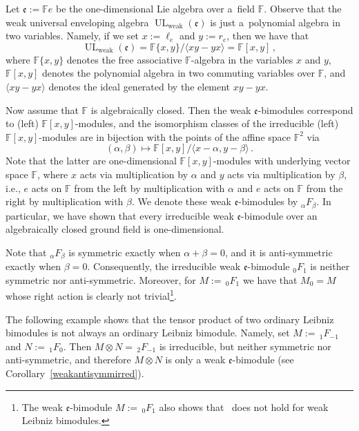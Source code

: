 \documentclass{jonasart}
\DeclareMathOperator{\UL}{UL}
\DeclareMathOperator{\weak}{weak}
\newcommand{\ef}{\mathfrak{e}}
\newcommand{\fbb}{\mathbb{F}}
\begin{document}
	\begin{example}\label{weak1dim}
		{Let $\ef:=\fbb e$ be the one-dimensional Lie algebra over a~field
		$\fbb$. Observe that the weak universal enveloping algebra $\UL_{\weak}
		(\ef)$ is just a~polynomial algebra in two variables. Namely, if we set $x:=
		\ell_e$ and $y:=r_e$, then we have that}
		\[
			\UL_{\weak}(\ef)=\fbb\{x,y\}/\langle xy-yx\rangle=\fbb[x,y]\,,
		\]
		{where $\fbb\{x,y\}$ denotes the free associative $\fbb$-algebra in the variables $x$ and $y$, $\fbb[x,y]$ denotes the polynomial algebra in two commuting variables over $\fbb$, and $\langle xy-yx\rangle$ denotes the ideal generated by the element $xy-yx$.}

		{Now assume that $\fbb$ is algebraically closed. Then the weak $\ef$-bimodules correspond to (left) $\fbb[x,y]$-modules, and the isomorphism classes of the irreducible (left) $\fbb[x,y]$-modules are in bijection with the points of the affine space $\fbb^2$ via}
		\[
			(\alpha,\beta)\mapsto\fbb[x,y]/\langle x-\alpha,y-\beta\rangle\,.
		\]
		{Note that the latter are one-dimensional $\fbb[x,y]$-modules with underlying vector space $\fbb$, where $x$ acts via multiplication by $\alpha$ and $y$ acts via multiplication by $\beta$, i.e., $e$ acts on $\fbb$ from the left by multiplication with $\alpha$ and $e$ acts on $\fbb$ from the right by multiplication with $\beta$. We denote these weak $\ef$-bimodules by $_\alpha F_\beta$. In particular, we have shown that every irreducible weak $\ef$-bimodule over an algebraically closed ground field is one-dimensional.}

		{Note that $_\alpha F_\beta$ is symmetric exactly when $\alpha+\beta=0$, and it is anti-symmetric exactly when $\beta=0$. Consequently, the irreducible weak $\ef$-bimodule $_0 F_1$ is neither symmetric nor anti-symmetric. Moreover, for $M:=\,_0 F_1$ we have that $M_0 =M$ whose right action is clearly not trivial\footnote{The weak $\ef$-bimodule $M:=\,_0 F_1$ also shows that~\cite[Lemma~1.1]{FW1} does not hold for weak Leibniz bimodules.}}.

		{The following example shows that the tensor product of two ordinary
		Leibniz bimodules is not always an ordinary Leibniz bimodule. Namely, set
		$M:=\,_1 F_{-1}$ and $N:=\,_1 F_0$. Then $M\otimes N=\,_2 F_{-1}$ is irreducible, but neither symmetric nor anti-symmetric, and therefore $M\otimes N$ is only a weak $\ef$-bimodule (see Corollary~\ref{weakantisymmirred})}.
	\end{example}
\end{document}
